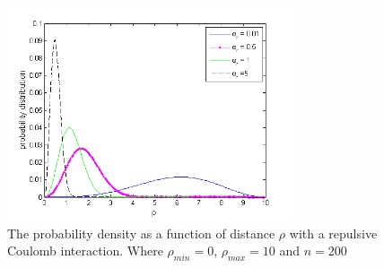 \begin{figure}[H]
	\centering
	\includegraphics[width=0.75\textwidth]{Figures/ProbFuncOmega.png}
	\caption{The probability density as a function of distance $\rho$ with a repulsive Coulomb interaction. Where $\rho_{min} = 0$, $\rho_{max} = 10$ and $n = 200$}
	\label{fig:ProbFuncOmega}
\end{figure}





